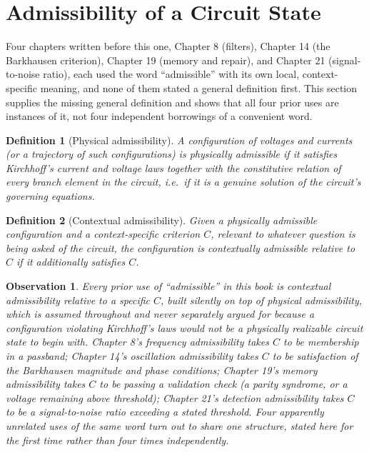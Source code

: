 \documentclass[12pt]{article}
\newtheorem{definition}{Definition}
\newtheorem{observation}{Observation}
\begin{document}
\section{Admissibility of a Circuit State}

Four chapters written before this one, Chapter 8 (filters), Chapter 14 (the Barkhausen criterion), Chapter 19 (memory and repair), and Chapter 21 (signal-to-noise ratio), each used the word ``admissible'' with its own local, context-specific meaning, and none of them stated a general definition first. This section supplies the missing general definition and shows that all four prior uses are instances of it, not four independent borrowings of a convenient word.

\begin{definition}[Physical admissibility]
A configuration of voltages and currents (or a trajectory of such configurations) is \emph{physically admissible} if it satisfies Kirchhoff's current and voltage laws together with the constitutive relation of every branch element in the circuit, i.e.\ if it is a genuine solution of the circuit's governing equations.
\end{definition}

\begin{definition}[Contextual admissibility]
Given a physically admissible configuration and a context-specific criterion $C$, relevant to whatever question is being asked of the circuit, the configuration is \emph{contextually admissible relative to $C$} if it additionally satisfies $C$.
\end{definition}

\begin{observation}
Every prior use of ``admissible'' in this book is contextual admissibility relative to a specific $C$, built silently on top of physical admissibility, which is assumed throughout and never separately argued for because a configuration violating Kirchhoff's laws would not be a physically realizable circuit state to begin with. Chapter 8's frequency admissibility takes $C$ to be membership in a passband; Chapter 14's oscillation admissibility takes $C$ to be satisfaction of the Barkhausen magnitude and phase conditions; Chapter 19's memory admissibility takes $C$ to be passing a validation check (a parity syndrome, or a voltage remaining above threshold); Chapter 21's detection admissibility takes $C$ to be a signal-to-noise ratio exceeding a stated threshold. Four apparently unrelated uses of the same word turn out to share one structure, stated here for the first time rather than four times independently.
\end{observation}
\end{document}
